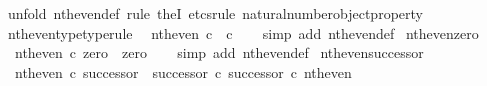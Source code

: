 \begin{isabellebody}
\isamarkupfalse%
\ {\isacharparenleft}{\kern0pt}unfold\ nth{\isacharunderscore}{\kern0pt}even{\isacharunderscore}{\kern0pt}def{\isacharcomma}{\kern0pt}\ rule\ theI{\isacharprime}{\kern0pt}{\isacharcomma}{\kern0pt}\ etcs{\isacharunderscore}{\kern0pt}rule\ natural{\isacharunderscore}{\kern0pt}number{\isacharunderscore}{\kern0pt}object{\isacharunderscore}{\kern0pt}property{}{\isacharparenright}{\kern0pt}%
\endisatagproof
{\isafoldproof}%
%
\isadelimproof
\isanewline
%
\endisadelimproof
\isanewline
{}\isamarkupfalse%
\ nth{\isacharunderscore}{\kern0pt}even{\isacharunderscore}{\kern0pt}type{\isacharbrackleft}{\kern0pt}type{\isacharunderscore}{\kern0pt}rule{\isacharbrackright}{\kern0pt}{\isacharcolon}{\kern0pt}\isanewline
\ \ {\isachardoublequoteopen}nth{\isacharunderscore}{\kern0pt}even{\isacharcolon}{\kern0pt}\ {\isasymnat}\isactrlsub c\ {\isasymrightarrow}\ {\isasymnat}\isactrlsub c{\isachardoublequoteclose}\isanewline
%
\isadelimproof
\ \ %
\endisadelimproof
%
\isatagproof
{}\isamarkupfalse%
\ {\isacharparenleft}{\kern0pt}simp\ add{\isacharcolon}{\kern0pt}\ nth{\isacharunderscore}{\kern0pt}even{\isacharunderscore}{\kern0pt}def{}{\isacharparenright}{\kern0pt}%
\endisatagproof
{\isafoldproof}%
%
\isadelimproof
\isanewline
%
\endisadelimproof
\isanewline
{}\isamarkupfalse%
\ nth{\isacharunderscore}{\kern0pt}even{\isacharunderscore}{\kern0pt}zero{\isacharcolon}{\kern0pt}\isanewline
\ \ {\isachardoublequoteopen}nth{\isacharunderscore}{\kern0pt}even\ {\isasymcirc}\isactrlsub c\ zero\ {\isacharequal}{\kern0pt}\ zero{\isachardoublequoteclose}\isanewline
%
\isadelimproof
\ \ %
\endisadelimproof
%
\isatagproof
{}\isamarkupfalse%
\ {\isacharparenleft}{\kern0pt}simp\ add{\isacharcolon}{\kern0pt}\ nth{\isacharunderscore}{\kern0pt}even{\isacharunderscore}{\kern0pt}def{}{\isacharparenright}{\kern0pt}%
\endisatagproof
{\isafoldproof}%
%
\isadelimproof
\isanewline
%
\endisadelimproof
\isanewline
{}\isamarkupfalse%
\ nth{\isacharunderscore}{\kern0pt}even{\isacharunderscore}{\kern0pt}successor{\isacharcolon}{\kern0pt}\isanewline
\ \ {\isachardoublequoteopen}nth{\isacharunderscore}{\kern0pt}even\ {\isasymcirc}\isactrlsub c\ successor\ {\isacharequal}{\kern0pt}\ {\isacharparenleft}{\kern0pt}successor\ {\isasymcirc}\isactrlsub c\ successor{\isacharparenright}{\kern0pt}\ {\isasymcirc}\isactrlsub c\ nth{\isacharunderscore}{\kern0pt}even{\isachardoublequoteclose}\isanewline
%
\isadelimproof
\ \ %
\endisadelimproof
%
\isatagproof
{}\isamarkupfalse%

\end{isabellebody}
